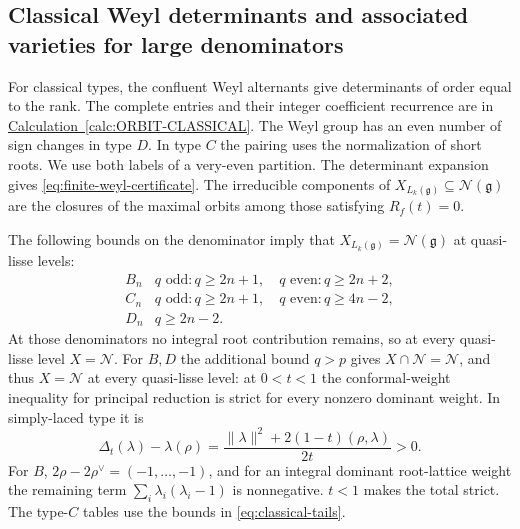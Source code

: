 \documentclass[11pt,a4paper]{amsart}
\numberwithin{equation}{section}
\theoremstyle{definition}
\theoremstyle{remark}
\newcommand{\g}{\mathfrak g}
\newcommand{\N}{\mathcal N}
\begin{document}
\subsection{Classical Weyl determinants and associated varieties for large denominators}
\label{cert:classical-formula}
For classical types, the confluent Weyl alternants give determinants of
order equal to the rank. The complete entries and their integer
coefficient recurrence are in \hyperref[calc:ORBIT-CLASSICAL]{Calculation~\ref*{calc:ORBIT-CLASSICAL}}.
The Weyl group has an even number of sign changes in type $D$.
In type $C$ the pairing uses the normalization of short roots.
We use both labels of a very-even partition. The determinant
expansion gives \eqref{eq:finite-weyl-certificate}.
The irreducible components of $X_{L_k(\g)}\subseteq\N(\g)$ are
the closures of the maximal orbits among those satisfying $R_f(t)=0$.

The following bounds on the denominator imply that
$X_{L_k(\g)}=\N(\g)$ at quasi-lisse levels:
\begin{equation}\label{eq:classical-tails}
\begin{array}{c|l}
B_n&q\text{ odd}:q\ge2n+1,\quad q\text{ even}:q\ge2n+2,\\
C_n&q\text{ odd}:q\ge2n+1,\quad q\text{ even}:q\ge4n-2,\\
D_n&q\ge2n-2.
\end{array}
\end{equation}
At those denominators no integral root contribution remains, so at every quasi-lisse
level $X=\N$. For $B,D$ the additional bound $q>p$ gives
$X\cap\N=\N$, and thus $X=\N$ at every quasi-lisse level:
at $0<t<1$ the conformal-weight inequality for principal reduction is strict for every nonzero
dominant weight. In simply-laced type it is
$$
 \Delta_t(\lambda)-\lambda(\rho)
 =\frac{\|\lambda\|^2+2(1-t)(\rho,\lambda)}{2t}>0.
$$
For $B$, $2\rho-2\rho^\vee=(-1,\ldots,-1)$, and for an integral
dominant root-lattice weight the remaining term
$\sum_i\lambda_i(\lambda_i-1)$ is nonnegative. $t<1$ makes the total
strict. The type-$C$ tables use the bounds in
\eqref{eq:classical-tails}.
\end{document}
